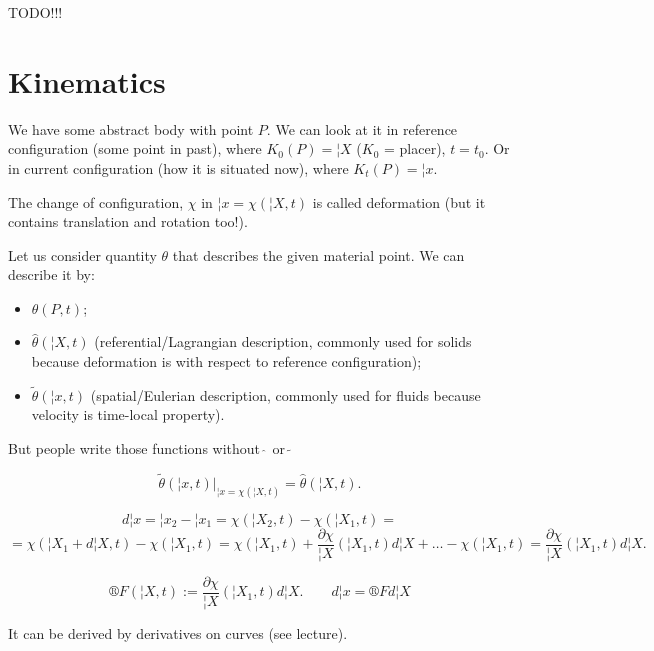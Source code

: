 \documentclass[12pt]{article}					%
\begin{document}

TODO!!!


\section{Kinematics}
\begin{definice}
	We have some abstract body with point $P$. We can look at it in reference configuration (some point in past), where $K_0(P) = ¦X$ ($K_0$ = placer), $t = t_0$. Or in current configuration (how it is situated now), where $K_t(P) = ¦x$.

	The change of configuration, $χ$ in $¦x = \chi (¦X, t)$ is called deformation (but it contains translation and rotation too!).
\end{definice}

\begin{definice}
	Let us consider quantity $θ$ that describes the given material point. We can describe it by:
	\begin{itemize}
		\item $θ(P, t)$;
		\item $\hat{θ}(¦X, t)$ (referential/Lagrangian description, commonly used for solids because deformation is with respect to reference configuration);
		\item $\tilde θ(¦x, t)$ (spatial/Eulerian description, commonly used for fluids because velocity is time-local property).
	\end{itemize}
	But people write those functions without $\hat{\ }$ or $\tilde{\ }$

	\begin{poznamka}
		$$ \tilde θ(¦x, t)|_{¦x = χ(¦X, t)} = \hat{θ}(¦X, t). $$
	\end{poznamka}
\end{definice}

\begin{definice}
	$$ d¦x = ¦x_2 - ¦x_1 = χ(¦X_2, t) - χ(¦X_1, t) = $$
	$$ = χ(¦X_1 + d¦X, t) - χ(¦X_1, t) = χ(¦X_1, t) + \frac{\partial χ}{¦X}(¦X_1, t) d¦X + … - χ(¦X_1, t) = \frac{\partial χ}{¦X}(¦X_1, t) d¦X. $$

	$$ ®F(¦X, t) := \frac{\partial χ}{¦X}(¦X_1, t) d¦X. \qquad d¦x = ®F d¦X $$

	\begin{poznamkain}
		It can be derived by derivatives on curves (see lecture).
	\end{poznamkain}
\end{definice}
\end{document}
